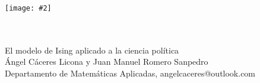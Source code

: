 \documentclass[portrait, a0b,final]{a0poster}%
\numberwithin{equation}{section}
\newcommand{\uamlogo}[3][2pt]{
    \psset{unit=#2,linewidth=#1 }
    \psline*[linearc=.25,linecolor=#3](2.8,2)(2,2)(1.8,0)(2.8,2)(3.8,0)(3.6,2)(2,2)(1.8,0)
    \psline*[linecolor=#3](0,0)(.8,0)(1.8,2)(1,2)(0,0)
    \psline*[linecolor=#3](4.8,0)(3.8,2)(4.6,2)(5.6,0)(4.8,0)
    \psline*[linearc=.25,linecolor=#3](3.8,0)(2.8,2)(3.6,2)(4.6,0)(3.8,0)
    \psline*[linearc=.25,linecolor=#3](4.6,0)(3.8,0)(2.8,2)(3.6,2)(4.6,0)
    \rput{180}(5.6,2){%
    \psline*[linearc=.25,linecolor=white](2.8,2)(2,2)(1.8,0)(2.8,2)(3.8,0)(3.6,2)(2,2)(1.8,0)
    \psline*[linearc=.25,linecolor=white](1,0)(1.8,0)(2.8,2)(2,2)(1,0)
    \psline*[linearc=.25,linecolor=white](1.8,0)(1,0)(2,2)(2.8,2)(1.8,0)
    \psline*[linearc=.25,linecolor=white](3.8,0)(2.8,2)(3.6,2)(4.6,0)(3.8,0)
    \psline*[linearc=.25,linecolor=white](4.6,0)(3.8,0)(2.8,2)(3.6,2)(4.6,0)
    \psline[linearc=.25,linecolor=#3](1,0)(2,2)(3.6,2)(4.6,0)
    \psline[linecolor=#3](1,0)(1.8,0)
    \psline[linearc=.25,linecolor=#3](4.6,0)(3.8,0)
    \psline[linearc=.25,linecolor=#3](1.8,0)(2.8,2)(3.8,0)}
    \psline*[linearc=.25,linecolor=#3](1,0)(1.8,0)(2.8,2)(2,2)(1,0)
    \psline*[linearc=.25,linecolor=#3](1.8,0)(1,0)(2,2)(2.8,2)(1.8,0)}
\newenvironment{poster}{
  \begin{center}
  \begin{minipage}[c]{0.98\textwidth}
}{
  \end{minipage}
  \end{center}
}
\newenvironment{pcolumn}[1]{
  \begin{minipage}{#1\textwidth}
  \begin{center}
}{
  \end{center}
  \end{minipage}
}
\newcommand{\myfig}[3][0]{
\begin{center}
  \vspace{1.5cm}
  \texttt{[image: \#2]}
  \nobreak\medskip
\end{center}}
\newcommand{\mycaption}[1]{
  \vspace{0.5cm}
  \begin{quote}
    {{\sc Figura} \arabic{figure}: #1}
  \end{quote}
  \vspace{1cm}
  \stepcounter{figure}
}
\begin{document}
\begin{poster}
\begin{center}
\begin{pcolumn}{0.98}
{%
\begin{minipage}[c][9.5cm][c]{0.15\textwidth}                                %
  \begin{center}
        \begin{center}
           \myfig{logogrande.ps}{1.0}    
        \end{center}
  \end{center}
\end{minipage}
\begin{minipage}[c][9.5cm][c]{0.80\textwidth}                                 %
  \begin{center}
    {\sc {\textcolor{rojo}{\Huge Congreso internacional de}}}\\[4mm]
    {\sc {\textcolor{rojo}{\Huge Matem\'aticas y sus aplicaciones.}} }\\[8mm]
    {\sc \Huge El modelo de Ising aplicado a la ciencia pol\'itica}\\[4mm]
    {\Large \'Angel C\'aceres Licona y Juan Manuel Romero Sanpedro} \\
    {\large Departamento de Matem\'aticas Aplicadas, angelcaceres@outlook.com} \\%
  \end{center}
\end{minipage}


}
\end{pcolumn}
\end{center}
\end{poster}
\end{document}
